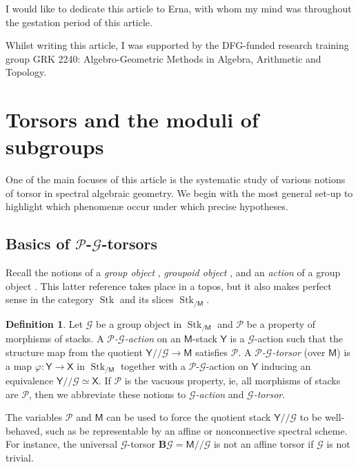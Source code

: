 \documentclass[11pt, a4paper]{article}
\newcommand{\1}{\mathbf{1}}
\newcommand{\BG}{\mathbf{B}\mathcal{G}}
\DeclareMathOperator{\Stk}{Stk}
\newcommand{\calG}{\mathcal{G}}
\newcommand{\M}{\mathsf{M}}
\newcommand{\calP}{\mathcal{P}}
\newcommand{\X}{\mathsf{X}}
\newcommand{\Y}{\mathsf{Y}}
\theoremstyle{plain}
\theoremstyle{definition}
\newtheorem{mydef}[equation]{Definition}
\theoremstyle{remark}\numberwithin{equation}{section}
\begin{document}
I would like to dedicate this article to Erna, with whom my mind was throughout the gestation period of this article.

Whilst writing this article, I was supported by the DFG-funded research training group GRK 2240: Algebro-Geometric Methods in Algebra, Arithmetic and Topology.

\section{Torsors and the moduli of subgroups}\label{sec:SAG}
One of the main focuses of this article is the systematic study of various notions of torsor in spectral algebraic geometry. We begin with the most general set-up to highlight which phenomenæ occur under which precise hypotheses.

\subsection{Basics of \texorpdfstring{$\calP$-$\calG$-}{P-G-}torsors}\label{ssec:torsor}
Recall the notions of a \emph{group object} \cite[Df.7.2.2.1]{htt}, \emph{groupoid object} \cite[Df.6.1.2.7]{htt}, and an \emph{action} of a group object \cite[Df.3.1]{nikolaus_schreiber_stevenson_general_theory}. This latter reference takes place in a topos, but it also makes perfect sense in the category $\Stk$ and its slices $\Stk_{/\M}$.

\begin{mydef}\label{df:g-torsor}
    Let $\calG$ be a group object in $\Stk_{/\M}$ and $\calP$ be a property of morphisms of stacks. A \emph{$\calP$-$\calG$-action} on an $\M$-stack $\Y$ is a $\calG$-action such that the structure map from the quotient $\Y//\calG \to \M$ satisfies $\calP$. A \emph{$\calP$-$\calG$-torsor} (over $\M$) is a map $\varphi \colon \Y \to \X$ in $\Stk_{/\M}$ together with a $\calP$-$\calG$-action on $\Y$ inducing an equivalence $\Y // \calG \simeq \X$. If $\calP$ is the vacuous property, ie, all morphisms of stacks are $\calP$, then we abbreviate these notions to \emph{$\calG$-action} and \emph{$\calG$-torsor}.
\end{mydef}

The variables $\calP$ and $\M$ can be used to force the quotient stack $\Y// \calG$ to be well-behaved, such as be representable by an affine or nonconnective spectral scheme. For instance, the universal $\calG$-torsor $\BG = \M // \calG$ is not an affine torsor if $\calG$ is not trivial.
\end{document}
